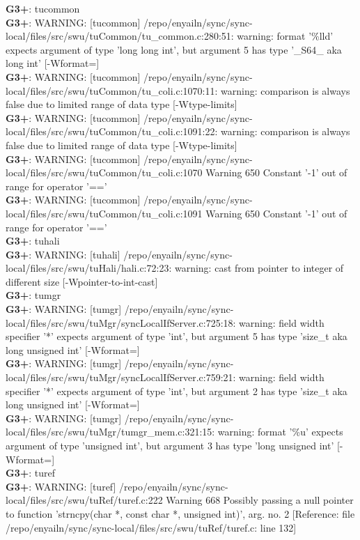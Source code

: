 \documentclass[12pt,twoside]{article}
\begin{document}
\textbf{G3+}: tucommon\\ 
\textbf{G3+}: WARNING: [tucommon] /repo/enyailn/sync/sync-local/files/src/swu/tuCommon/tu\_common.c:280:51: warning: format '\%lld' expects argument of type 'long long int', but argument 5 has type '\_S64\_ {aka long int}' [-Wformat=]\\ 
\textbf{G3+}: WARNING: [tucommon] /repo/enyailn/sync/sync-local/files/src/swu/tuCommon/tu\_coli.c:1070:11: warning: comparison is always false due to limited range of data type [-Wtype-limits]\\ 
\textbf{G3+}: WARNING: [tucommon] /repo/enyailn/sync/sync-local/files/src/swu/tuCommon/tu\_coli.c:1091:22: warning: comparison is always false due to limited range of data type [-Wtype-limits]\\ 
\textbf{G3+}: WARNING: [tucommon] /repo/enyailn/sync/sync-local/files/src/swu/tuCommon/tu\_coli.c:1070 Warning 650 Constant '-1' out of range for operator '=='\\ 
\textbf{G3+}: WARNING: [tucommon] /repo/enyailn/sync/sync-local/files/src/swu/tuCommon/tu\_coli.c:1091 Warning 650 Constant '-1' out of range for operator '=='\\ 
  
\textbf{G3+}: tuhali\\ 
\textbf{G3+}: WARNING: [tuhali] /repo/enyailn/sync/sync-local/files/src/swu/tuHali/hali.c:72:23: warning: cast from pointer to integer of different size [-Wpointer-to-int-cast]\\ 
  
\textbf{G3+}: tumgr\\ 
\textbf{G3+}: WARNING: [tumgr] /repo/enyailn/sync/sync-local/files/src/swu/tuMgr/syncLocalIfServer.c:725:18: warning: field width specifier '*' expects argument of type 'int', but argument 5 has type 'size\_t {aka long unsigned int}' [-Wformat=]\\ 
\textbf{G3+}: WARNING: [tumgr] /repo/enyailn/sync/sync-local/files/src/swu/tuMgr/syncLocalIfServer.c:759:21: warning: field width specifier '*' expects argument of type 'int', but argument 2 has type 'size\_t {aka long unsigned int}' [-Wformat=]\\ 
\textbf{G3+}: WARNING: [tumgr] /repo/enyailn/sync/sync-local/files/src/swu/tuMgr/tumgr\_mem.c:321:15: warning: format '\%u' expects argument of type 'unsigned int', but argument 3 has type 'long unsigned int' [-Wformat=]\\ 
  
\textbf{G3+}: turef\\ 
\textbf{G3+}: WARNING: [turef] /repo/enyailn/sync/sync-local/files/src/swu/tuRef/turef.c:222 Warning 668 Possibly passing a null pointer to function 'strncpy(char *, const char *, unsigned int)', arg. no. 2 [Reference: file /repo/enyailn/sync/sync-local/files/src/swu/tuRef/turef.c: line 132]\\ 
  
\end{document}
